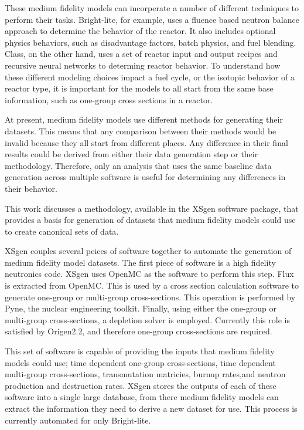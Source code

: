 \documentclass{article}
\begin{document}
These medium fidelity models can incorperate a number of different techniques to perform their tasks. Bright-lite, for example, uses a fluence based neutron balance approach to determine the behavior of the reactor. It also includes optional physics behaviors, such as disadvantage factors, batch physics, and fuel blending. Class, on the other hand, uses a set of reactor input and output recipes and recursive neural networks to determing reactor behavior. To understand how these different modeling choices impact a fuel cycle, or the isotopic behavior of a reactor type, it is important for the models to all start from the same base information, such as one-group cross sections in a reactor.

At present, medium fidelity models use different methods for generating their datasets. This means that any comparison between their methods would be invalid because they all start from different places. Any difference in their final results could be derived from either their data generation step or their methodology. Therefore, only an analysis that uses the same baseline data generation across multiple software is useful for determining any differences in their behavior.

This work discusses a methodology, available in the XSgen software package, that provides a basis for generation of datasets that medium fidelity models could use to create canonical sets of data.

XSgen couples several peices of software together to automate the generation of medium fidelity model datasets. The first piece of software is a high fidelity neutronics code. XSgen uses OpenMC as the software to perform this step. Flux is extracted from OpenMC\cite{class}. This is used by a cross section calculation software to generate one-group or multi-group cross-sections. This operation is performed by Pyne, the nuclear engineering toolkit\cite{pyne}. Finally, using either the one-group or multi-group cross-sections, a depletion solver is employed. Currently this role is satisfied by Origen2.2\cite{origen2}, and therefore one-group cross-sections are required.

This set of software is capable of providing the inputs that medium fidelity models could use; time dependent one-group cross-sections, time dependent multi-group cross-sections, transmutation matricies, burnup rates,and  neutron production and destruction rates. XSgen stores the outputs of each of these software into a single large database, from there medium fidelity models can extract the information they need to derive a new dataset for use. This process is currently automated for only Bright-lite.
\end{document}

